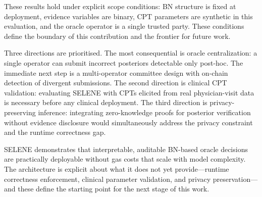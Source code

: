 \documentclass[journal]{IEEEtran}
\begin{document}
These results hold under explicit scope conditions:
BN structure is fixed at deployment, evidence
variables are binary, CPT parameters are synthetic
in this evaluation, and the oracle operator is a
single trusted party. These conditions define the
boundary of this contribution and the frontier for
future work.

Three directions are prioritised. The most
consequential is oracle centralization: a single
operator can submit incorrect posteriors detectable
only post-hoc. The immediate next step is a
multi-operator committee design with on-chain
detection of divergent submissions. The second
direction is clinical CPT validation: evaluating SELENE
with CPTs elicited from real physician-visit data is
necessary before any clinical deployment. The third
direction is privacy-preserving inference: integrating
zero-knowledge proofs for posterior verification
without evidence disclosure would simultaneously
address the privacy constraint and the runtime
correctness gap.

SELENE demonstrates that interpretable, auditable
BN-based oracle decisions are practically deployable
without gas costs that scale with model complexity.
The architecture is explicit about what it does not
yet provide---runtime correctness enforcement,
clinical parameter validation, and privacy
preservation---and these define the starting point
for the next stage of this work.




\end{document}
